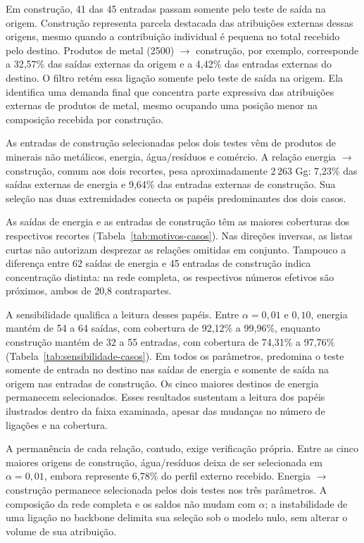 Em construção, 41 das 45 entradas passam somente pelo teste de saída na origem. Construção representa parcela destacada das atribuições externas dessas origens, mesmo quando a contribuição individual é pequena no total recebido pelo destino. Produtos de metal (2500) $\rightarrow$ construção, por exemplo, corresponde a 32,57\% das saídas externas da origem e a 4,42\% das entradas externas do destino. O filtro retém essa ligação somente pelo teste de saída na origem. Ela identifica uma demanda final que concentra parte expressiva das atribuições externas de produtos de metal, mesmo ocupando uma posição menor na composição recebida por construção.

As entradas de construção selecionadas pelos dois testes vêm de produtos de minerais não metálicos, energia, água/resíduos e comércio. A relação energia $\rightarrow$ construção, comum aos dois recortes, pesa aproximadamente 2\,263 Gg: 7,23\% das saídas externas de energia e 9,64\% das entradas externas de construção. Sua seleção nas duas extremidades conecta os papéis predominantes dos dois casos.

As saídas de energia e as entradas de construção têm as maiores coberturas dos respectivos recortes (Tabela~\ref{tab:motivos-casos}). Nas direções inversas, as listas curtas não autorizam desprezar as relações omitidas em conjunto. Tampouco a diferença entre 62 saídas de energia e 45 entradas de construção indica concentração distinta: na rede completa, os respectivos números efetivos são próximos, ambos de 20,8 contrapartes.

A sensibilidade qualifica a leitura desses papéis. Entre $\alpha=0{,}01$ e $0{,}10$, energia mantém de 54 a 64 saídas, com cobertura de 92,12\% a 99,96\%, enquanto construção mantém de 32 a 55 entradas, com cobertura de 74,31\% a 97,76\% (Tabela~\ref{tab:sensibilidade-casos}). Em todos os parâmetros, predomina o teste somente de entrada no destino nas saídas de energia e somente de saída na origem nas entradas de construção. Os cinco maiores destinos de energia permanecem selecionados. Esses resultados sustentam a leitura dos papéis ilustrados dentro da faixa examinada, apesar das mudanças no número de ligações e na cobertura.

A permanência de cada relação, contudo, exige verificação própria. Entre as cinco maiores origens de construção, água/resíduos deixa de ser selecionada em $\alpha=0{,}01$, embora represente 6,78\% do perfil externo recebido. Energia $\rightarrow$ construção permanece selecionada pelos dois testes nos três parâmetros. A composição da rede completa e os saldos não mudam com $\alpha$; a instabilidade de uma ligação no backbone delimita sua seleção sob o modelo nulo, sem alterar o volume de sua atribuição.



